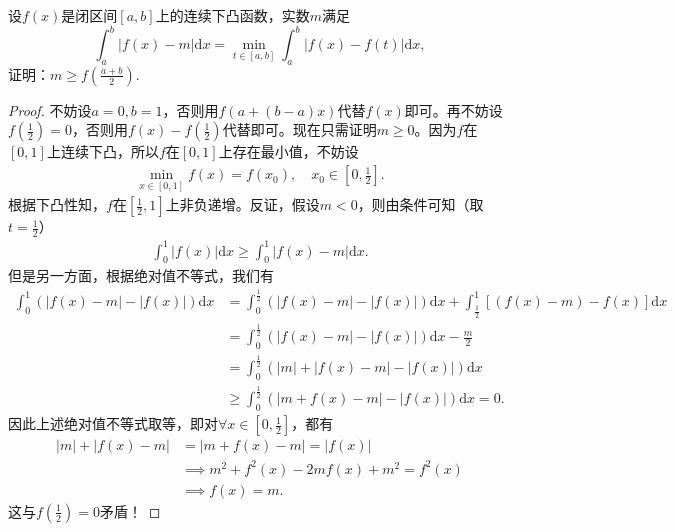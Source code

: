 \documentclass[../../main.tex]{subfiles}
\begin{document}
\begin{example}
设\( f(x) \)是闭区间\( [a,b] \)上的连续下凸函数，实数\( m \)满足
\[
\int_{a}^{b}|f(x) - m|\mathrm{d}x = \min_{t \in [a,b]}\int_{a}^{b}|f(x) - f(t)|\mathrm{d}x,
\]
证明：\( m \geqslant f\left( \frac{a + b}{2} \right) \).
\end{example}
\begin{proof}
不妨设\( a=0, b=1 \)，否则用\( f(a+(b-a)x) \)代替\( f(x) \)即可。再不妨设\( f\left( \frac{1}{2} \right) =0 \)，否则用\( f(x)-f\left( \frac{1}{2} \right) \)代替即可。现在只需证明\( m \geqslant 0 \)。因为\( f \)在\( [0,1] \)上连续下凸，所以\( f \)在\( [0,1] \)上存在最小值，不妨设
\begin{align*}
\min_{x \in [0,1]} f(x) = f(x_0), \quad x_0 \in \left[ 0, \frac{1}{2} \right].
\end{align*}
根据下凸性知，\( f \)在\( \left[ \frac{1}{2},1 \right] \)上非负递增。反证，假设\( m < 0 \)，则由条件可知（取\( t=\frac{1}{2} \)）
\begin{align*}
\int_0^1 |f(x)| \mathrm{d}x \geqslant \int_0^1 |f(x)-m| \mathrm{d}x.
\end{align*}
但是另一方面，根据绝对值不等式，我们有
\begin{align*}
\int_0^1 \left( |f(x)-m| - |f(x)| \right) \mathrm{d}x &= \int_0^{\frac{1}{2}} \left( |f(x)-m| - |f(x)| \right) \mathrm{d}x + \int_{\frac{1}{2}}^1 \left[ (f(x)-m) - f(x) \right] \mathrm{d}x \\
&= \int_0^{\frac{1}{2}} \left( |f(x)-m| - |f(x)| \right) \mathrm{d}x - \frac{m}{2} \\
&= \int_0^{\frac{1}{2}} \left( |m| + |f(x)-m| - |f(x)| \right) \mathrm{d}x \\
&\geqslant \int_0^{\frac{1}{2}} \left( |m + f(x) - m| - |f(x)| \right) \mathrm{d}x = 0.
\end{align*}
因此上述绝对值不等式取等，即对\( \forall x \in \left[ 0, \frac{1}{2} \right] \)，都有
\begin{align*}
|m| + |f(x)-m| &= |m + f(x) - m| = |f(x)| \\
&\implies m^2 + f^2(x) - 2mf(x) + m^2 = f^2(x) \\
&\implies f(x) = m.
\end{align*}
这与\( f\left( \frac{1}{2} \right) = 0 \)矛盾！

\end{proof}
\end{document}

